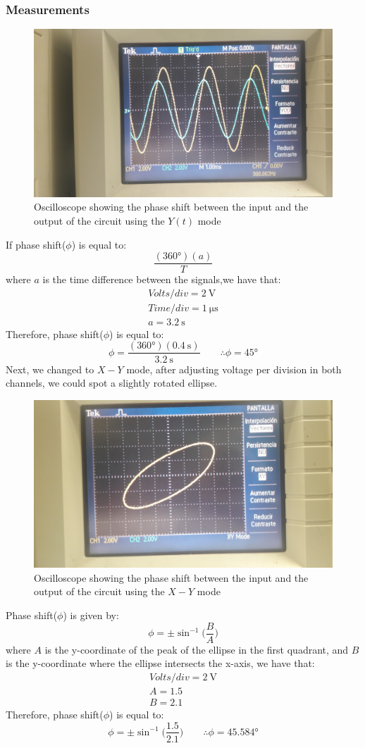 \documentclass[letterpaper]{article}
\begin{document}
\subsubsection{Measurements}
\begin{figure}[H]
    \centering
    \includegraphics[width=.5\linewidth,angle=180]{img/part4/5}
    \caption{Oscilloscope showing the phase shift between the input and the output of the circuit
    using the $Y(t)$ mode}
\end{figure}
If phase shift($\phi$) is equal to:
\[\frac{(\ang{360})(a)}{T}\]
where $a$ is the time difference between the signals,we have that:
\begin{gather*}
    Volts/div = \SI{2}{\volt}\\
    Time/div = \SI{1}{\micro\second}\\
    a = \SI{3.2}{\second}
\end{gather*}
Therefore, phase shift($\phi$) is equal to:
\[\phi=\frac{(\ang{360})(\SI{0.4}{\second})}{\SI{3.2}{\second}}\qquad\therefore\phi=\ang{45}\]
Next, we changed to $X-Y$
mode, after adjusting voltage per division in both channels, we could spot a slightly rotated ellipse.
\begin{figure}[H]
    \centering
    \includegraphics[width=.5\linewidth,angle=180]{img/part4/6}
    \caption{Oscilloscope showing the phase shift between the input and the output of the circuit
    using the $X-Y$ mode}
\end{figure}
Phase shift($\phi$) is given by:
\[\phi=\pm\sin^{-1}\Big(\frac{B}{A}\Big)\]
where $A$ is the y-coordinate of the peak of the ellipse in the first quadrant, and $B$ is the
y-coordinate where the ellipse intersects the x-axis, we have that:
\begin{gather*}
    Volts/div = \SI{2}{\volt}\\
    A = 1.5\\
    B = 2.1
\end{gather*}
Therefore, phase shift($\phi$) is equal to:
\[\phi=\pm\sin^{-1}\Big(\frac{1.5}{2.1}\Big)\qquad\therefore\phi=\ang{45.584}\]
\end{document}
